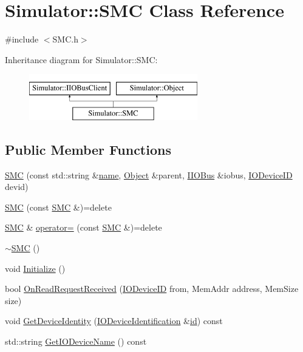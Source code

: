\hypertarget{class_simulator_1_1_s_m_c}{\section{Simulator\+:\+:S\+M\+C Class Reference}
\label{class_simulator_1_1_s_m_c}
}


{\ttfamily \#include $<$S\+M\+C.\+h$>$}

Inheritance diagram for Simulator\+:\+:S\+M\+C\+:\begin{figure}[H]
\begin{center}
\leavevmode
\includegraphics[height=2.000000cm]{class_simulator_1_1_s_m_c}
\end{center}
\end{figure}
\subsection*{Public Member Functions}
\begin{DoxyCompactItemize}
\item 
\hyperlink{class_simulator_1_1_s_m_c_a14c8f7d405dc0622ee2d2faf730eafb6}{S\+M\+C} (const std\+::string \&\hyperlink{mtconf_8c_a8f8f80d37794cde9472343e4487ba3eb}{name}, \hyperlink{class_simulator_1_1_object}{Object} \&parent, \hyperlink{class_simulator_1_1_i_i_o_bus}{I\+I\+O\+Bus} \&iobus, \hyperlink{namespace_simulator_a3493d987c866ad6b8aaa704c42502db0}{I\+O\+Device\+I\+D} devid)
\item 
\hyperlink{class_simulator_1_1_s_m_c_a0d1b334513ac991e01e6b1355058e3b5}{S\+M\+C} (const \hyperlink{class_simulator_1_1_s_m_c}{S\+M\+C} \&)=delete
\item 
\hyperlink{class_simulator_1_1_s_m_c}{S\+M\+C} \& \hyperlink{class_simulator_1_1_s_m_c_a675175b5e9daafdbdeafb80a346d5c59}{operator=} (const \hyperlink{class_simulator_1_1_s_m_c}{S\+M\+C} \&)=delete
\item 
\hyperlink{class_simulator_1_1_s_m_c_a1d024238c12b233aeaa96f882b9a1143}{$\sim$\+S\+M\+C} ()
\item 
void \hyperlink{class_simulator_1_1_s_m_c_a7f30745f487023e3e6d418929c3f1e5b}{Initialize} ()
\item 
bool \hyperlink{class_simulator_1_1_s_m_c_a90ed00f2d4a6a4f5a91b4acf30a99b9d}{On\+Read\+Request\+Received} (\hyperlink{namespace_simulator_a3493d987c866ad6b8aaa704c42502db0}{I\+O\+Device\+I\+D} from, Mem\+Addr address, Mem\+Size size)
\item 
void \hyperlink{class_simulator_1_1_s_m_c_a21088de3e8e8e8c35b1bd066dd8a04ba}{Get\+Device\+Identity} (\hyperlink{struct_simulator_1_1_i_o_device_identification}{I\+O\+Device\+Identification} \&\hyperlink{mtconf_8c_aa3185401f04d30bd505daebf48c39cc5}{id}) const 
\item 
std\+::string \hyperlink{class_simulator_1_1_s_m_c_a3585763d046bf294b630977ce7ea4274}{Get\+I\+O\+Device\+Name} () const 
\end{DoxyCompactItemize}


